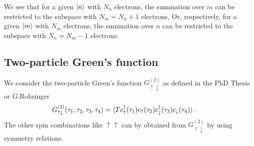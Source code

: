 \documentclass[12pt,a4paper]{scrartcl}
\numberwithin{equation}{section}
\begin{document}
We see that for a given $\ket{n}$ with $N_n$ electrons, the summation over $m$ can be restricted to the 
subspace with $N_m=N_n+1$ electrons, Or, respectively, 
for a given $\ket{m}$ with $N_m$ electrons, the summation over $n$ can be restricted to the 
subspace with $N_n=N_m-1$ electrons.


\subsection{Two-particle Green's function}
We consider the two-particle Green's function $G^{(2)}_{\uparrow \downarrow}$ as defined in the PhD Thesis or G.Rohringer
\begin{align}
G^{(2)}_{\uparrow \downarrow}(\tau_1,\tau_2,\tau_3,\tau_4)
 &= \braket{T c^{\dagger}_{\uparrow}(\tau_1) c_{\uparrow}(\tau_2) c^{\dagger}_{\downarrow}(\tau_3) c_{\downarrow}(\tau_4)  }.
\end{align}
The other spin combinations like $\uparrow \uparrow $ can by obtained from $G^{(2)}_{\uparrow \downarrow}$ by using symmetry relations.
\end{document}
